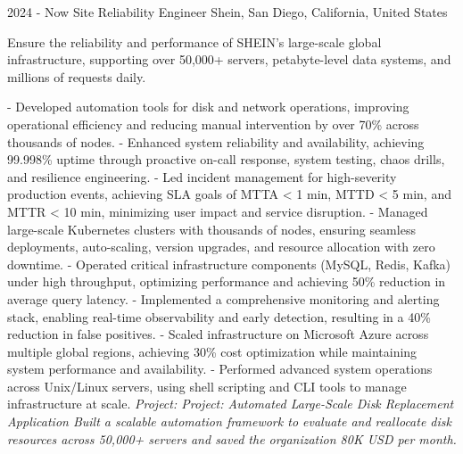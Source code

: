 \documentclass[9pt]{developercv} %
\begin{document}
\begin{entrylist}
	\entry
		{2024 - Now}
		{Site Reliability Engineer}
		{Shein, San Diego, California, United States}
		{
            Ensure the reliability and performance of SHEIN’s large-scale global infrastructure, supporting over 50,000+ servers, petabyte-level data systems, and millions of requests daily.\newline

            - Developed automation tools for disk and network operations, improving operational efficiency and reducing manual intervention by over 70\% across thousands of nodes.\newline
            - Enhanced system reliability and availability, achieving 99.998\% uptime through proactive on-call response, system testing, chaos drills, and resilience engineering.\newline
            - Led incident management for high-severity production events, achieving SLA goals of MTTA < 1 min, MTTD < 5 min, and MTTR < 10 min, minimizing user impact and service disruption.\newline
            - Managed large-scale Kubernetes clusters with thousands of nodes, ensuring seamless deployments, auto-scaling, version upgrades, and resource allocation with zero downtime.\newline
			- Operated critical infrastructure components (MySQL, Redis, Kafka) under high throughput, optimizing performance and achieving 50\% reduction in average query latency.\newline
			- Implemented a comprehensive monitoring and alerting stack, enabling real-time observability and early detection, resulting in a 40\% reduction in false positives.\newline
			- Scaled infrastructure on Microsoft Azure across multiple global regions, achieving 30\% cost optimization while maintaining system performance and availability.\newline
			- Performed advanced system operations across Unix/Linux servers, using shell scripting and CLI tools to manage infrastructure at scale.\newline\newline
            \textit{Project: Project: Automated Large-Scale Disk Replacement Application\newline
            Built a scalable automation framework to evaluate and reallocate disk resources across 50,000+ servers and saved the organization 80K USD per month.}\newline\newline
}
\end{entrylist}
\end{document}
